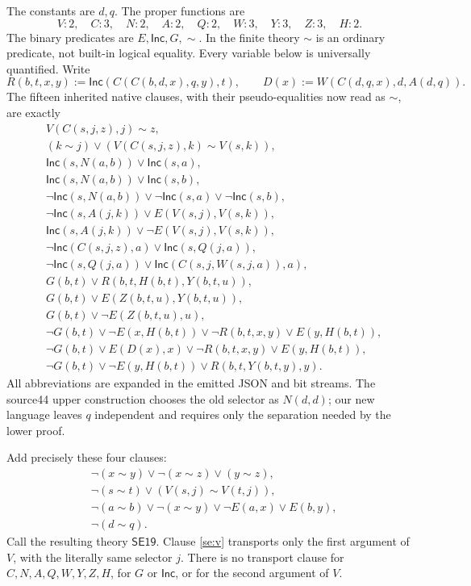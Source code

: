 The constants are $d,q$. The proper functions are
\[
 V:2,\quad C:3,\quad N:2,\quad A:2,\quad Q:2,
 \quad W:3,\quad Y:3,\quad Z:3,\quad H:2.
\]
The binary predicates are $E,\mathsf{Inc},G,\sim$. In the finite theory
$\sim$ is an ordinary predicate, not built-in logical equality.
Every variable below is universally quantified. Write
\[
 R(b,t,x,y):=\mathsf{Inc}(C(C(b,d,x),q,y),t),\qquad
 D(x):=W(C(d,q,x),d,A(d,q)).
\]
The fifteen inherited native clauses, with their pseudo-equalities now
read as $\sim$, are exactly
\begin{align*}
 &V(C(s,j,z),j)\sim z,\\
 &(k\sim j)\lor (V(C(s,j,z),k)\sim V(s,k)),\\
 &\mathsf{Inc}(s,N(a,b))\lor\mathsf{Inc}(s,a),\\
 &\mathsf{Inc}(s,N(a,b))\lor\mathsf{Inc}(s,b),\\
 &\neg\mathsf{Inc}(s,N(a,b))\lor\neg\mathsf{Inc}(s,a)
        \lor\neg\mathsf{Inc}(s,b),\\
 &\neg\mathsf{Inc}(s,A(j,k))\lor E(V(s,j),V(s,k)),\\
 &\mathsf{Inc}(s,A(j,k))\lor\neg E(V(s,j),V(s,k)),\\
 &\neg\mathsf{Inc}(C(s,j,z),a)\lor\mathsf{Inc}(s,Q(j,a)),\\
 &\neg\mathsf{Inc}(s,Q(j,a))
        \lor\mathsf{Inc}(C(s,j,W(s,j,a)),a),\\
 &G(b,t)\lor R(b,t,H(b,t),Y(b,t,u)),\\
 &G(b,t)\lor E(Z(b,t,u),Y(b,t,u)),\\
 &G(b,t)\lor\neg E(Z(b,t,u),u),\\
 &\neg G(b,t)\lor\neg E(x,H(b,t))\lor\neg R(b,t,x,y)
        \lor E(y,H(b,t)),\\
 &\neg G(b,t)\lor E(D(x),x)\lor\neg R(b,t,x,y)
        \lor E(y,H(b,t)),\\
 &\neg G(b,t)\lor\neg E(y,H(b,t))\lor R(b,t,Y(b,t,y),y).
\end{align*}
All abbreviations are expanded in the emitted JSON and bit streams.
The source44 upper construction chooses the old selector as $N(d,d)$;
our new language leaves $q$ independent and requires only the separation
needed by the lower proof.

Add precisely these four clauses:
\begin{align}
 &\neg(x\sim y)\lor\neg(x\sim z)\lor (y\sim z),
          \tag{SE1}\label{se:eq}\\
 &\neg(s\sim t)\lor (V(s,j)\sim V(t,j)),
          \tag{SE2}\label{se:v}\\
 &\neg(a\sim b)\lor\neg(x\sim y)\lor\neg E(a,x)\lor E(b,y),
          \tag{SE3}\label{se:mem}\\
 &\neg(d\sim q).
          \tag{SE4}\label{se:sep}
\end{align}
Call the resulting theory $\mathsf{SE19}$. Clause \eqref{se:v} transports
only the first argument of $V$, with the literally same selector $j$.
There is no transport clause for $C,N,A,Q,W,Y,Z,H$, for $G$ or
$\mathsf{Inc}$, or for the second argument of $V$.

